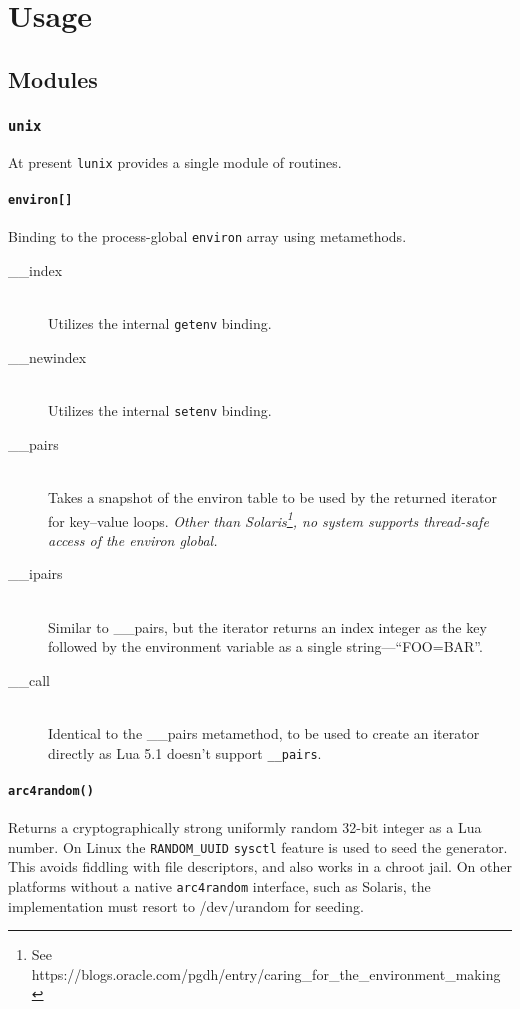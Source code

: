 \documentclass[11pt, oneside]{memoir}
\newcommand*{\lunix}[0]{\texttt{lunix}\xspace}
\newcommand*{\fn}[1]{\texttt{#1}\xspace}
\newcommand*{\const}[1]{\texttt{#1}\xspace}
\newcounter{toccols}
\newenvironment{Module}[1]{
	\subsection{\texttt{#1}}
	\addtocontents{toc}{
		\protect\begin{multicols}{\value{toccols}}
	}
}{
	\addtocontents{toc}{\protect\end{multicols}}
}
\begin{document}
\chapter{Usage}

\section{Modules}

\begin{Module}{unix}

At present \lunix provides a single module of routines.

\subsubsection[\fn{environ[]}]{\fn{environ[]}}

Binding to the process-global \texttt{environ} array using metamethods.

\begin{description}
\item[\_\_index] \hfill \\
Utilizes the internal \fn{getenv} binding.
\item[\_\_newindex] \hfill \\
Utilizes the internal \fn{setenv} binding.
\item[\_\_pairs] \hfill \\
Takes a snapshot of the environ table to be used by the returned iterator for key--value loops. \emph{Other than Solaris\footnote{See https://blogs.oracle.com/pgdh/entry/caring\_for\_the\_environment\_making}, no system supports thread-safe access of the environ global.}
\item[\_\_ipairs] \hfill \\
Similar to \_\_pairs, but the iterator returns an index integer as the key followed by the environment variable as a single string---``FOO=BAR''.
\item[\_\_call] \hfill \\
Identical to the \_\_pairs metamethod, to be used to create an iterator directly as Lua 5.1 doesn't support \texttt{\_\_pairs}.
\end{description}

\subsubsection[\fn{arc4random}]{\fn{arc4random()}}

Returns a cryptographically strong uniformly random 32-bit integer as a Lua number. On Linux the
\const{RANDOM\_UUID} \fn{sysctl} feature is used to seed the generator. This avoids fiddling with file descriptors, and also works in a chroot jail. On other platforms without a native \fn{arc4random} interface, such as Solaris, the implementation must resort to /dev/urandom for seeding.


\end{Module}
\end{document}
